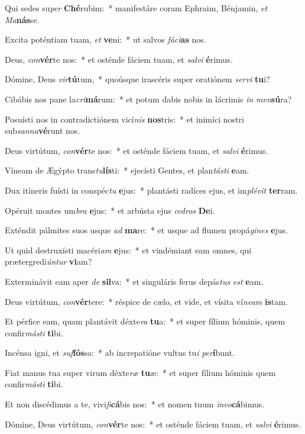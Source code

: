 \item Qui sedes su\textit{per} \textbf{Ché}rubim:~* manifestáre coram Ephraim, Bénjamin, \textit{et} \textit{Ma}\textbf{nás}se.
\item Excita poténtiam tuam, \textit{et} \textbf{ve}ni:~* ut salvos \textit{fá}\textit{ci}\textbf{as} nos.
\item Deus, \textit{con}\textbf{vér}te nos:~* et osténde fáciem tuam, et \textit{sal}\textit{vi} \textbf{é}rimus.
\item Dómine, Deus \textit{vir}\textbf{tú}tum,~* quoúsque irascéris super oratiónem \textit{ser}\textit{vi} \textbf{tu}i?
\item Cibábis nos pane la\textit{cri}\textbf{má}rum:~* et potum dabis nobis in lácrimis \textit{in} \textit{men}\textbf{sú}ra?
\item Posuísti nos in contradictiónem vicí\textit{nis} \textbf{nos}tris:~* et inimíci nostri sub\textit{san}\textit{na}\textbf{vé}runt nos.
\item Deus virtútum, \textit{con}\textbf{vér}te nos:~* et osténde fáciem tuam, et \textit{sal}\textit{vi} \textbf{é}rimus.
\item Víneam de Ægýpto trans\textit{tu}\textbf{lís}ti:~* ejecísti Gentes, et plan\textit{tás}\textit{ti} \textbf{e}am.
\item Dux itíneris fuísti in conspéc\textit{tu} \textbf{e}jus:~* plantásti radíces ejus, et im\textit{plé}\textit{vit} \textbf{ter}ram.
\item Opéruit montes um\textit{bra} \textbf{e}jus:~* et arbústa ejus \textit{ce}\textit{dros} \textbf{De}i.
\item Exténdit pálmites suos usque \textit{ad} \textbf{ma}re:~* et usque ad flumen propá\textit{gi}\textit{nes} \textbf{e}jus.
\item Ut quid destruxísti macéri\textit{am} \textbf{e}jus:~* et vindémiant eam omnes, qui prætergredi\textit{ún}\textit{tur} \textbf{vi}am?
\item Exterminávit eam aper \textit{de} \textbf{sil}va:~* et singuláris ferus depás\textit{tus} \textit{est} \textbf{e}am.
\item Deus virtútum, \textit{con}\textbf{vér}tere:~* réspice de cælo, et vide, et vísita ví\textit{ne}\textit{am} \textbf{is}tam.
\item Et pérfice eam, quam plantávit déxte\textit{ra} \textbf{tu}a:~* et super fílium hóminis, quem confir\textit{más}\textit{ti} \textbf{ti}bi.
\item Incénsa igni, et \textit{suf}\textbf{fós}sa:~* ab increpatióne vultus tu\textit{i} \textit{per}\textbf{í}bunt.
\item Fiat manus tua super virum déxte\textit{ræ} \textbf{tu}æ:~* et super fílium hóminis quem confir\textit{más}\textit{ti} \textbf{ti}bi.
\item Et non discédimus a te, vivi\textit{fi}\textbf{cá}bis nos:~* et nomen tuum \textit{in}\textit{vo}\textbf{cá}bimus.
\item Dómine, Deus virtútum, \textit{con}\textbf{vér}te nos:~* et osténde fáciem tuam, et \textit{sal}\textit{vi} \textbf{é}rimus.

